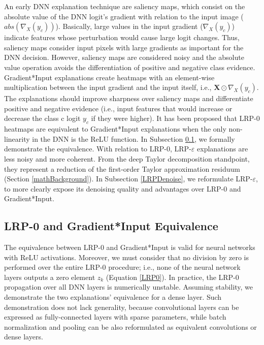 \documentclass[fleqn,10pt]{wlscirep}
\begin{document}
{An early DNN explanation technique are saliency maps\cite{saliency}, which consist on the absolute value of the DNN logit's gradient with relation to the input image ($abs(\nabla_{X}(y_{c}))$). Basically, large values in the input gradient ($\nabla_{X}(y_{c})$) indicate features whose perturbation would cause large logit changes. Thus, saliency maps consider input pixels with large gradients as important for the DNN decision. However, saliency maps are considered noisy and the absolute value operation avoids the differentiation of positive and negative class evidence\cite{LRPvsGrad}. Gradient*Input explanations\cite{GradInput} create heatmaps with an element-wise multiplication between the input gradient and the input itself, i.e., $\bm{X} \odot \nabla_{X}(y_{c})$. The explanations should improve sharpness over saliency maps and differentiate positive and negative evidence\cite{LRPvsGrad} (i.e., input features that would increase or decrease the class c logit $y_{c}$ if they were higher). It has been proposed\cite{LRPvsGrad} that LRP-0\cite{LRP} heatmaps are equivalent to Gradient*Input explanations\cite{GradInput} when the only non-linearity in the DNN is the ReLU function. In Subsection \ref{equivalence}, we formally demonstrate the equivalence. With relation to LRP-0, LRP-$\varepsilon$ explanations are less noisy and more coherent\cite{LRPBook}. From the deep Taylor decomposition standpoint, they represent a reduction of the first-order Taylor approximation residuum\cite{LRPBook} (Section \ref{mathBackground}). In Subsection \ref{LRPDenoise}, we reformulate LRP-$\varepsilon$, to more clearly expose its denoising quality and advantages over LRP-0 and Gradient*Input.

\subsection{LRP-0 and Gradient*Input Equivalence}
\label{equivalence}
The equivalence between LRP-0 and Gradient*Input is valid for neural networks with ReLU activations. Moreover, we must consider that no division by zero is performed over the entire LRP-0 procedure; i.e., none of the neural network layers outputs a zero element $z_{k}$ (Equation \ref{LRP0}). In practice, the LRP-0 propagation over all DNN layers is numerically unstable. Assuming stability, we demonstrate the two explanations' equivalence for a dense layer. Such demonstration does not lack generality, because convolutional layers can be expressed as fully-connected layers with sparse parameters, while batch normalization and pooling can be also reformulated as equivalent convolutions or dense layers.

}
\end{document}
